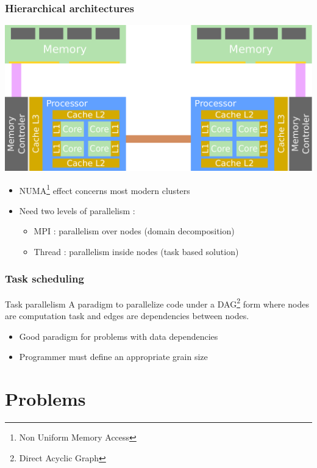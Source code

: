 \documentclass{beamer}
\begin{document}
\begin{frame}
  \frametitle{Hierarchical architectures}
  \centerline{\includegraphics[width=0.9\linewidth]{numa_architecture}}

  \begin{itemize}
    \item NUMA\footnote{Non Uniform Memory Access} effect concerns most modern clusters
    \item Need two levels of parallelism :
      \begin{itemize}
        \item MPI : parallelism over nodes (domain decomposition)
        \item Thread : parallelism inside nodes (task based solution)
      \end{itemize}
  \end{itemize}
\end{frame}


\begin{frame}
  \frametitle{Task scheduling}
  
  \begin{block}{Task parallelism}
    A paradigm to parallelize code under a DAG\footnote{Direct Acyclic Graph} form
    where nodes are computation task and edges are dependencies between nodes.
  \end{block}

  \begin{itemize}
    \item Good paradigm for problems with data dependencies
    \item Programmer must define an appropriate grain size
  \end{itemize}
\end{frame}



\section{Problems}
\end{document}
